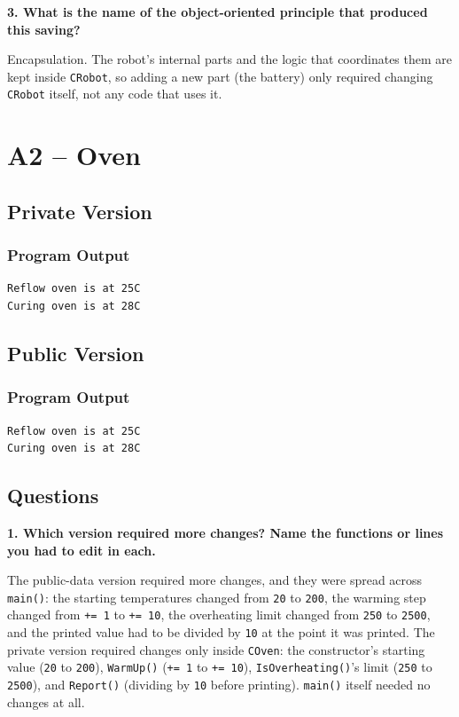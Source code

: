 \documentclass[10pt,a4paper]{article}
\newcommand{\question}[1]{%
    \vspace{5pt}
    \textbf{#1}\par
    \vspace{2pt}
}
\begin{document}
\question{3. What is the name of the object-oriented principle that produced this saving?}

Encapsulation. The robot's internal parts and the logic that coordinates
them are kept inside \texttt{CRobot}, so adding a new part (the battery)
only required changing \texttt{CRobot} itself, not any code that uses it.

\newpage
\section{A2 -- Oven}

\subsection{Private Version}

\subsubsection{Program Output}

\begin{lstlisting}[style=output]
Reflow oven is at 25C
Curing oven is at 28C
\end{lstlisting}

\subsection{Public Version}

\subsubsection{Program Output}

\begin{lstlisting}[style=output]
Reflow oven is at 25C
Curing oven is at 28C
\end{lstlisting}

\subsection{Questions}

\question{1. Which version required more changes? Name the functions or lines you had to edit in each.}

The public-data version required more changes, and they were spread across
\texttt{main()}: the starting temperatures changed from \texttt{20} to
\texttt{200}, the warming step changed from \texttt{+= 1} to \texttt{+= 10},
the overheating limit changed from \texttt{250} to \texttt{2500}, and the
printed value had to be divided by \texttt{10} at the point it was printed.
The private version required changes only inside \texttt{COven}: the
constructor's starting value (\texttt{20} to \texttt{200}), \texttt{WarmUp()}
(\texttt{+= 1} to \texttt{+= 10}), \texttt{IsOverheating()}'s limit
(\texttt{250} to \texttt{2500}), and \texttt{Report()} (dividing by \texttt{10}
before printing). \texttt{main()} itself needed no changes at all.
\end{document}
